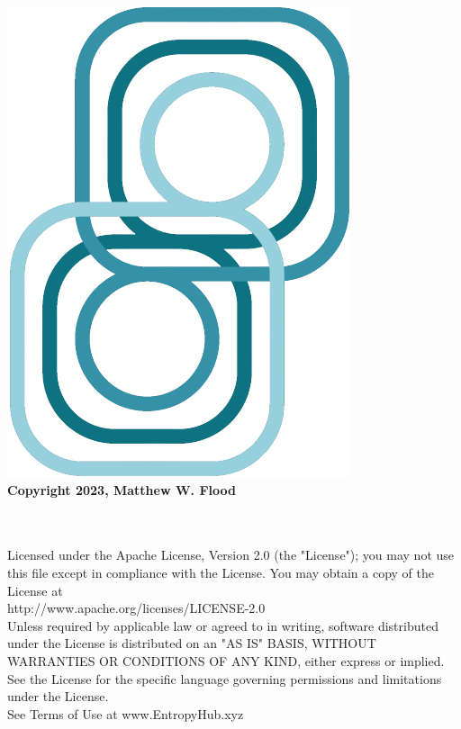\thispagestyle{plain}
	
\footnotesize

	\begingroup
	  \begin{center}	 
	  \vspace*{4cm} 
		\includegraphics[scale=.75]{EntropyHubLogo3.png}	\\	
		\vspace*{\fill}
	  \textbf{Copyright 2023, Matthew W. Flood}\\ \ \\ \
		\end{center}	   
	
	  \noindent Licensed under the Apache License, Version 2.0 (the "License");
	   you may not use this file except in compliance with the License.
	   You may obtain a copy of the License at \\	   
	
	       http://www.apache.org/licenses/LICENSE-2.0\\
	
	   \noindent Unless required by applicable law or agreed to in writing, software
	   distributed under the License is distributed on an "AS IS" BASIS,
	   WITHOUT WARRANTIES OR CONDITIONS OF ANY KIND, either express or implied.
	   See the License for the specific language governing permissions and
	   limitations under the License.\\
	   
	   \noindent See Terms of Use at www.EntropyHub.xyz\\ %
		
	\endgroup

\normalsize
	
